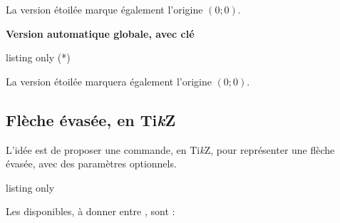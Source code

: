 \documentclass[french,11pt,a4paper]{article}
\providecommand\tikzlogo{Ti\textit{k}Z}
\let\TikZ\tikzlogo
\begin{document}
La version étoilée marque également l'origine $(0;0)$.

\begin{DemoCode}{}
\end{DemoCode}

\textbf{\large Version automatique globale, avec clé}

\begin{DemoCode}{listing only}
\tkzAutoGridActivate(*)

\begin{tikzpicture}[grilleauto=pasX§pasY]
\end{tikzpicture}
\end{DemoCode}

La version étoilée marquera également l'origine $(0;0)$.

\pagebreak

\subsection{Flèche évasée, en \TikZ}

L'idée est de proposer une commande, en  \TikZ, pour représenter une flèche évasée, avec des paramètres optionnels.

\begin{DemoCode}{listing only}
\end{DemoCode}

\begin{DemoCode}{}
\end{DemoCode}

Les  disponibles, à donner entre \MontreCode{[...]}, sont :
\end{document}
